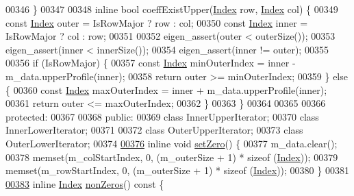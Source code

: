 \begin{DoxyCode}
00346     \}
00347 
00348     \textcolor{keyword}{inline} \textcolor{keywordtype}{bool} coeffExistUpper(\hyperlink{namespace_eigen_a62e77e0933482dafde8fe197d9a2cfde}{Index} row, \hyperlink{namespace_eigen_a62e77e0933482dafde8fe197d9a2cfde}{Index} col) \{
00349         \textcolor{keyword}{const} \hyperlink{namespace_eigen_a62e77e0933482dafde8fe197d9a2cfde}{Index} outer = IsRowMajor ? row : col;
00350         \textcolor{keyword}{const} \hyperlink{namespace_eigen_a62e77e0933482dafde8fe197d9a2cfde}{Index} inner = IsRowMajor ? col : row;
00351 
00352         eigen\_assert(outer < outerSize());
00353         eigen\_assert(inner < innerSize());
00354         eigen\_assert(inner != outer);
00355 
00356         \textcolor{keywordflow}{if} (IsRowMajor) \{
00357             \textcolor{keyword}{const} \hyperlink{namespace_eigen_a62e77e0933482dafde8fe197d9a2cfde}{Index} minOuterIndex = inner - m\_data.upperProfile(inner);
00358             \textcolor{keywordflow}{return} outer >= minOuterIndex;
00359         \} \textcolor{keywordflow}{else} \{
00360             \textcolor{keyword}{const} \hyperlink{namespace_eigen_a62e77e0933482dafde8fe197d9a2cfde}{Index} maxOuterIndex = inner + m\_data.upperProfile(inner);
00361             \textcolor{keywordflow}{return} outer <= maxOuterIndex;
00362         \}
00363     \}
00364 
00365 
00366 \textcolor{keyword}{protected}:
00367 
00368 \textcolor{keyword}{public}:
00369     \textcolor{keyword}{class }InnerUpperIterator;
00370     \textcolor{keyword}{class }InnerLowerIterator;
00371 
00372     \textcolor{keyword}{class }OuterUpperIterator;
00373     \textcolor{keyword}{class }OuterLowerIterator;
00374 
\hyperlink{class_eigen_1_1_skyline_matrix_afeb349e5dc4b5d8c107ff067b44438f5}{00376}     \textcolor{keyword}{inline} \textcolor{keywordtype}{void} \hyperlink{class_eigen_1_1_skyline_matrix_afeb349e5dc4b5d8c107ff067b44438f5}{setZero}() \{
00377         m\_data.clear();
00378         memset(m\_colStartIndex, 0, (m\_outerSize + 1) * \textcolor{keyword}{sizeof} (\hyperlink{group___core___module_a554f30542cc2316add4b1ea0a492ff02}{Index}));
00379         memset(m\_rowStartIndex, 0, (m\_outerSize + 1) * \textcolor{keyword}{sizeof} (\hyperlink{group___core___module_a554f30542cc2316add4b1ea0a492ff02}{Index}));
00380     \}
00381 
\hyperlink{class_eigen_1_1_skyline_matrix_aea6d3b694cef560f15a7d18c1f010604}{00383}     \textcolor{keyword}{inline} \hyperlink{group___core___module_a554f30542cc2316add4b1ea0a492ff02}{Index} \hyperlink{class_eigen_1_1_skyline_matrix_aea6d3b694cef560f15a7d18c1f010604}{nonZeros}()\textcolor{keyword}{ const }\{

\end{DoxyCode}
